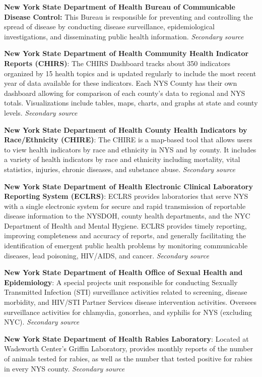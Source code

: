 \documentclass[
  english,
  letterpaper,
]{report}
\begin{document}
\textbf{New York State Department of Health Bureau of Communicable
Disease Control:} This Bureau is responsible for preventing and
controlling the spread of disease by conducting disease surveillance,
epidemiological investigations, and disseminating public health
information. \emph{Secondary source}

\textbf{New York State Department of Health Community Health Indicator
Reports (CHIRS)}: The CHIRS Dashboard tracks about 350 indicators
organized by 15 health topics and is updated regularly to include the
most recent year of data available for these indicators. Each NYS County
has their own dashboard allowing for comparison of each county's data to
regional and NYS totals. Visualizations include tables, maps, charts,
and graphs at state and county levels. \emph{Secondary source}

\textbf{New York State Department of Health County Health Indicators by
Race/Ethnicity (CHIRE)}: The CHIRE is a map-based tool that allows users
to view health indicators by race and ethnicity in NYS and by county. It
includes a variety of health indicators by race and ethnicity including
mortality, vital statistics, injuries, chronic diseases, and substance
abuse. \emph{Secondary source}

\textbf{New York State Department of Health Electronic Clinical
Laboratory Reporting System (ECLRS)}: ECLRS provides laboratories that
serve NYS with a single electronic system for secure and rapid
transmission of reportable disease information to the NYSDOH, county
health departments, and the NYC Department of Health and Mental Hygiene.
ECLRS provides timely reporting, improving completeness and accuracy of
reports, and generally facilitating the identification of emergent
public health problems by monitoring communicable diseases, lead
poisoning, HIV/AIDS, and cancer. \emph{Secondary source}

\textbf{New York State Department of Health Office of Sexual Health and
Epidemiology}: A special projects unit responsible for conducting
Sexually Transmitted Infection (STI) surveillance activities related to
screening, disease morbidity, and HIV/STI Partner Services disease
intervention activities. Oversees surveillance activities for chlamydia,
gonorrhea, and syphilis for NYS (excluding NYC). \emph{Secondary source}

\textbf{New York State Department of Health Rabies Laboratory}: Located
at Wadsworth Center's Griffin Laboratory, provides monthly reports of
the number of animals tested for rabies, as well as the number that
tested positive for rabies in every NYS county. \emph{Secondary source}
\end{document}
